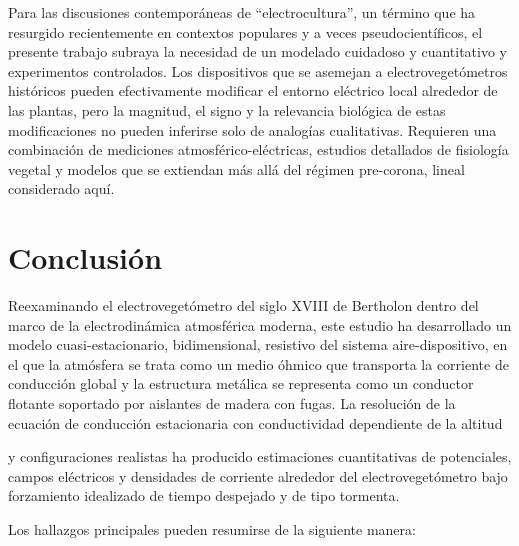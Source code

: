 \documentclass[
]{article}
\begin{document}
Para las discusiones contemporáneas de ``electrocultura'', un término
que ha resurgido recientemente en contextos populares y a veces
pseudocientíficos, el presente trabajo subraya la necesidad de un
modelado cuidadoso y cuantitativo y experimentos controlados. Los
dispositivos que se asemejan a electrovegetómetros históricos pueden
efectivamente modificar el entorno eléctrico local alrededor de las
plantas, pero la magnitud, el signo y la relevancia biológica de estas
modificaciones no pueden inferirse solo de analogías cualitativas.
Requieren una combinación de mediciones atmosférico-eléctricas, estudios
detallados de fisiología vegetal y modelos que se extiendan más allá del
régimen pre-corona, lineal considerado aquí.

\section{Conclusión}\label{conclusiuxf3n}

Reexaminando el electrovegetómetro del siglo XVIII de Bertholon dentro
del marco de la electrodinámica atmosférica moderna, este estudio ha
desarrollado un modelo cuasi-estacionario, bidimensional, resistivo del
sistema aire-dispositivo, en el que la atmósfera se trata como un medio
óhmico que transporta la corriente de conducción global y la estructura
metálica se representa como un conductor flotante soportado por
aislantes de madera con fugas. La resolución de la ecuación de
conducción estacionaria con conductividad dependiente de la altitud

y configuraciones realistas ha producido estimaciones cuantitativas de
potenciales, campos eléctricos y densidades de corriente alrededor del
electrovegetómetro bajo forzamiento idealizado de tiempo despejado y de
tipo tormenta.

Los hallazgos principales pueden resumirse de la siguiente manera:
\end{document}
